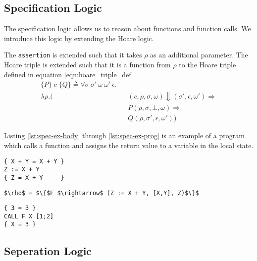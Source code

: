\subsection{Specification Logic}
The specification logic allows us to reason about functions and function calls. We introduce this logic by extending the Hoare logic.

The \verb|assertion| is extended such that it takes $\rho$ as an additional parameter. The Hoare triple is extended such that it is a function from $\rho$ to the Hoare triple defined in equation \ref{eqn:hoare_triple_def}.
\begin{equation}
\begin{alignedat}{2}
\{P\}\;c\;\{Q\} \triangleq \forall \sigma \: \sigma' \: \omega \: \omega' \: \epsilon .\\
 \lambda\rho.(
  && (c,\rho,\sigma,\omega) \Downarrow (\sigma', \epsilon, \omega') \Rightarrow\\
&& P(\rho,\sigma,\bot,\omega) \Rightarrow\\
&& Q(\rho,\sigma',\epsilon,\omega'))
\end{alignedat}
\end{equation}

Listing \ref{lst:spec-ex-body} through \ref{lst:spec-ex-prog} is an example of a program which calls a function and assigns the return value to a variable in the local state.

\begin{lstlisting}[mathescape=true,keepspaces=true,label=lst:spec-ex-body,caption=The body of the function F]
{ X + Y = X + Y }
Z := X + Y
{ Z = X + Y     }
\end{lstlisting}

\begin{lstlisting}[mathescape=true,keepspaces=true,label=lst:spec-ex-env,caption=A partial function space containing the function F.]
$\rho$ = $\{$F $\rightarrow$ (Z := X + Y, [X,Y], Z)$\}$
\end{lstlisting}

\begin{lstlisting}[mathescape=true,keepspaces=true,label=lst:spec-ex-prog,caption=A program which call the function F and stores the result in X]
{ 3 = 3 }
CALL F X [1;2]
{ X = 3 }
\end{lstlisting}

\subsection{Seperation Logic}

